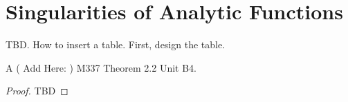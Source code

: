 \section{Singularities of Analytic Functions}

TBD. How to insert a table. First, design the table.

\begin{theorem}{A}
    ( Add Here: ) M337 Theorem 2.2 Unit B4.
\end{theorem}

\begin{proof}
TBD
\end{proof}
